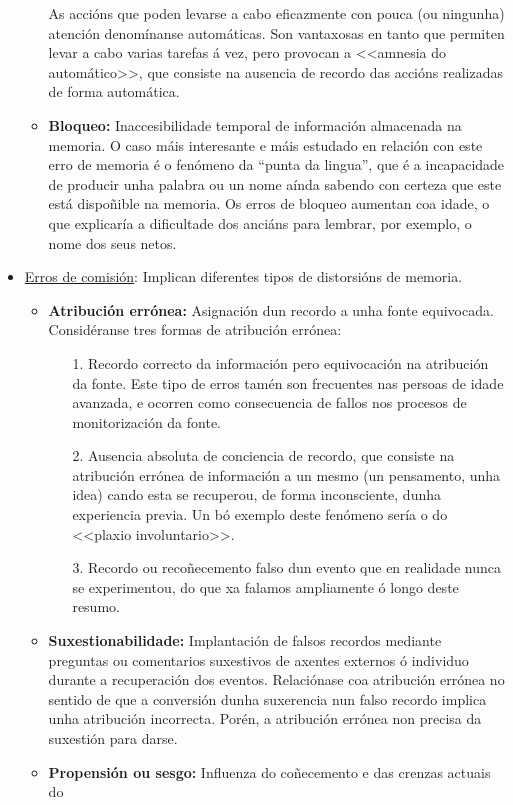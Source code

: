 \documentclass[a4paper,11pt]{article}
\begin{document}
\begin{itemize}
\begin{itemize}
		As accións que poden levarse a cabo eficazmente con pouca (ou ningunha) atención denomínanse
		automáticas. Son vantaxosas en tanto que permiten levar a cabo varias tarefas á vez, pero
		provocan a <<amnesia do automático>>, que consiste na ausencia de recordo das accións
		realizadas de forma automática.
		\item \textbf{Bloqueo:} Inaccesibilidade temporal de información almacenada na memoria. O
		caso máis interesante e máis estudado en relación con este erro de memoria é o fenómeno da
		``punta da lingua'', que é a incapacidade de producir unha palabra ou un nome aínda sabendo
		con certeza que este está dispoñible na memoria. Os erros de bloqueo aumentan coa idade, o
		que explicaría a dificultade dos anciáns para lembrar, por exemplo, o nome dos seus netos.
	\end{itemize}
	\item \underline{Erros de comisión}: Implican diferentes tipos de distorsións de memoria.
	\begin{itemize}
		\item \textbf{Atribución errónea:} Asignación dun recordo a unha fonte equivocada.
		Considéranse tres formas de atribución errónea:
		\begin{enumerate}
			\item[1.] Recordo correcto da información pero equivocación na atribución da fonte. Este
			tipo de erros tamén son frecuentes nas persoas de idade avanzada, e ocorren como
			consecuencia de fallos nos procesos de monitorización da fonte.
			\item[2.] Ausencia absoluta de conciencia de recordo, que consiste na atribución errónea
			de información a un mesmo (un pensamento, unha idea) cando esta se recuperou, de forma
			inconsciente, dunha experiencia previa. Un bó exemplo deste fenómeno sería o do <<plaxio
			involuntario>>.
			\item[3.] Recordo ou recoñecemento falso dun evento que en realidade nunca se
			experimentou, do que xa falamos ampliamente ó longo deste resumo.
		\end{enumerate}
		\item \textbf{Suxestionabilidade:} Implantación de falsos recordos mediante preguntas ou 
		comentarios suxestivos de axentes externos ó individuo durante a recuperación dos eventos.
		Relaciónase coa atribución errónea no sentido de que a conversión dunha suxerencia nun
		falso recordo implica unha atribución incorrecta. Porén, a atribución errónea non precisa da
		suxestión para darse.
		\item \textbf{Propensión ou sesgo:} Influenza do coñecemento e das crenzas actuais do 

\end{itemize}
\end{itemize}
\end{document}
